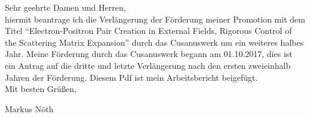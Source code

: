 \documentclass[a4paper,12pt]{article}
\begin{document}
Sehr geehrte Damen und Herren,\\

hiermit beantrage ich die Verlängerung der Förderung meiner Promotion mit dem Titel ``Electron-Positron Pair Creation in External Fields, 
Rigorous Control of the Scattering Matrix Expansion'' durch das Cusanuswerk um ein weiteres  halbes Jahr. 
Meine Förderung durch das Cusanuswerk begann am 01.10.2017, dies 
ist ein Antrag auf die dritte und letzte Verlängerung nach den ersten zweieinhalb Jahren der Förderung. Diesem Pdf ist mein Arbeitsbericht beigefügt.\\

Mit besten Grüßen,

Markus Nöth
\end{document}
